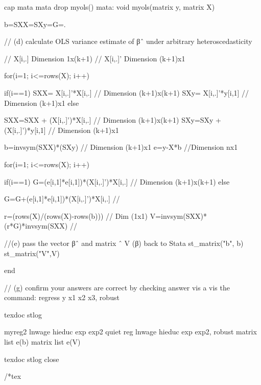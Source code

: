\documentclass[12pt]{article}
\begin{document}
cap mata mata drop myols()
mata:
void myols(matrix y, matrix X){

b=SXX=SXy=G=.

// (d) calculate OLS variance estimate of βˆ under arbitrary heteroscedasticity

// X[i,.] Dimension 1x(k+1) 
// X[i,.]' Dimension (k+1)x1 

for(i=1; i<=rows(X); i++){
			if(i==1){
				SXX= X[i,.]'*X[i,.] // Dimension (k+1)x(k+1)
				SXy= X[i,.]'*y[i,1] // Dimension (k+1)x1
			}
else {

				SXX=SXX + (X[i,.]')*X[i,.] // Dimension (k+1)x(k+1)
				SXy=SXy + (X[i,.]')*y[i,1] // Dimension (k+1)x1
			}
		}
b=invsym(SXX)*(SXy)  // Dimension (k+1)x1	
e=y-X*b
//Dimension nx1
		
for(i=1; i<=rows(X); i++){
			if(i==1){
				G=(e[i,1]*e[i,1])*(X[i,.]')*X[i,.] // Dimension (k+1)x(k+1)
			}
else {
				G=G+(e[i,1]*e[i,1])*(X[i,.]')*X[i,.] //
				
			}
		}

		
		 
		 
		r=(rows(X)/(rows(X)-rows(b))) // Dim (1x1)
	    V=invsym(SXX)*(r*G)*invsym(SXX) // 
		
//(e) pass the vector βˆ and matrix ˆ V (β) back to Stata
st_matrix("b", b)
st_matrix("V",V)

}


end

// (g) confirm your answers are correct by checking answer vis a vis the command: regress y x1 x2 x3, robust

texdoc stlog

myreg2 lnwage hieduc exp exp2 
quiet reg lnwage hieduc exp exp2, robust
matrix list e(b)
matrix list e(V)

texdoc stlog close

/*tex
\end{document}
